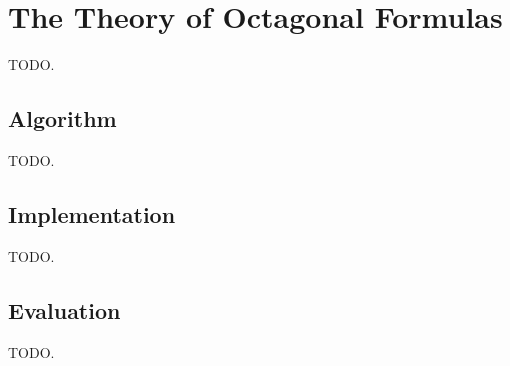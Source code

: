\chapter{The Theory of Octagonal Formulas}

TODO.

\section{Algorithm}

TODO.



\section{Implementation}
TODO.

\section{Evaluation}
TODO.


